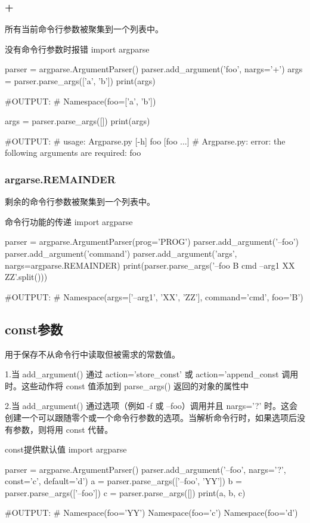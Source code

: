 \documentclass[11pt]{article}
\begin{document}
\subsubsection{+}
所有当前命令行参数被聚集到一个列表中。
\begin{Python}{没有命令行参数时报错}
import argparse

parser = argparse.ArgumentParser()
parser.add_argument('foo', nargs='+')
args = parser.parse_args(['a', 'b'])
print(args)

#OUTPUT:
#       Namespace(foo=['a', 'b'])

args = parser.parse_args([])
print(args)

#OUTPUT:
#       usage: Argparse.py [-h] foo [foo ...]
#       Argparse.py: error: the following arguments are required: foo
\end{Python}
\subsubsection{argarse.REMAINDER}
剩余的命令行参数被聚集到一个列表中。
\begin{Python}{命令行功能的传递}
import argparse

parser = argparse.ArgumentParser(prog='PROG')
parser.add_argument('--foo')
parser.add_argument('command')
parser.add_argument('args', nargs=argparse.REMAINDER)
print(parser.parse_args('--foo B cmd --arg1 XX ZZ'.split()))

#OUTPUT:
#       Namespace(args=['--arg1', 'XX', 'ZZ'], command='cmd', foo='B')
\end{Python}
\subsection{const参数}
用于保存不从命令行中读取但被需求的常数值。

1.当 add\_argument() 通过 action='store\_const' 或 action='append\_const 调用时。这些动作将 const 值添加到 parse\_args() 返回的对象的属性中

2.当 add\_argument() 通过选项（例如 -f 或 --foo）调用并且 nargs='?' 时。这会创建一个可以跟随零个或一个命令行参数的选项。当解析命令行时，如果选项后没有参数，则将用 const 代替。
\begin{Python}{const提供默认值}
import argparse

parser = argparse.ArgumentParser()
parser.add_argument('--foo', nargs='?', const='c', default='d')
a = parser.parse_args(['--foo', 'YY'])
b = parser.parse_args(['--foo'])
c = parser.parse_args([])
print(a, b, c)

#OUTPUT:
#       Namespace(foo='YY') Namespace(foo='c') Namespace(foo='d')
\end{Python}
\end{document}
